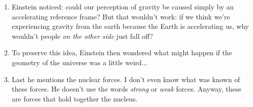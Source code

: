 \begin{enumerate}
  \item Einstein noticed: could our perception of gravity be caused
  simply by an accelerating reference frame? But that wouldn't work: if
  we think we're experiencing gravity from the earth because the Earth
  is accelerating us, why wouldn't people \emph{on the other side} just
  fall off?

  \item To preserve this idea, Einstein then wondered what might happen
  if the geometry of the universe was a little weird...

  \item Last he mentions the nuclear forces. I don't even know what was
  known of these forces. He doesn't use the words \emph{strong} or
  \emph{weak} forces. Anyway, these are forces that hold together the
  nucleus.

\end{enumerate}
